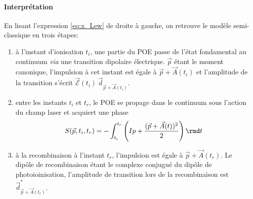\paragraph{Interprétation} En lisant l'expression \ref{eq:x_Lew} de droite à gauche, on retrouve le modèle semi-classique en trois étapes:
\begin{enumerate}[label=(\arabic*)]
\item à l'instant d'ionisation $t_i$, une partie du POE passe de l'état fondamental au continuum \textit{via} une transition dipolaire électrique. $\vec{p}$ étant le moment canonique, l'impulsion à cet instant est égale à $\vec{p} + \vec{A}(t_i)$ et l'amplitude de la transition s'écrit $\vec{\mathcal{E}}(t_i) \: \vec{d}_{\vec{p}+\vec{A}(t_i)}$.
\item entre les instants $t_i$ et $t_r$, le POE se propage dans le continuum sous l'action du champ laser et acquiert une phase 
\begin{equation}
S(\vec{p}, t_i, t_r) = - \int_{t_i}^{t_r} \left( Ip + \frac{(\vec{p} + \vec{A}(t))^2}{2} \right) \rmd t
\end{equation}
\item à la recombinaison à l'instant $t_r$, l'impulsion est égale à $\vec{p} + \vec{A}(t_r)$. Le dipôle de recombinaison étant le complexe conjugué du dipôle de photoioinisation, l'amplitude de transition lors de la recombinaison est $\vec{d}^*_{\vec{p}+\vec{A}(t_r)}$.
\end{enumerate}

